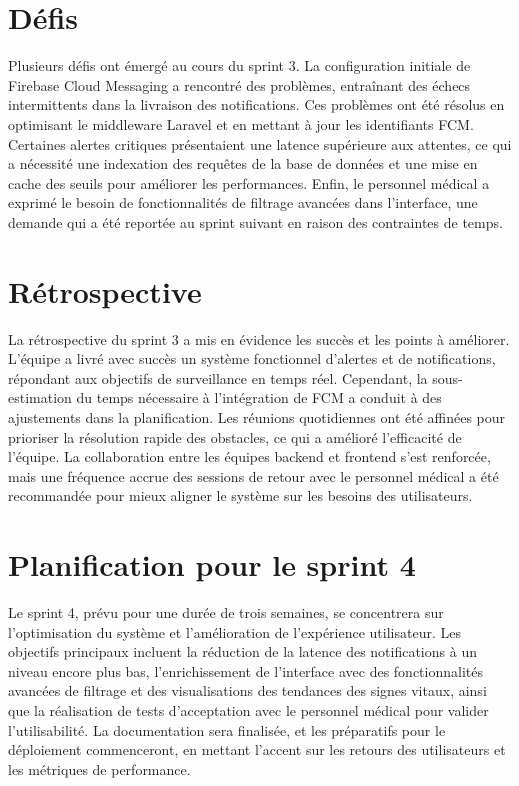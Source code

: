 \section{Défis}
Plusieurs défis ont émergé au cours du sprint 3. La configuration initiale de Firebase Cloud Messaging a rencontré des problèmes, entraînant des échecs intermittents dans la livraison des notifications. Ces problèmes ont été résolus en optimisant le middleware Laravel et en mettant à jour les identifiants FCM. Certaines alertes critiques présentaient une latence supérieure aux attentes, ce qui a nécessité une indexation des requêtes de la base de données et une mise en cache des seuils pour améliorer les performances. Enfin, le personnel médical a exprimé le besoin de fonctionnalités de filtrage avancées dans l’interface, une demande qui a été reportée au sprint suivant en raison des contraintes de temps.

\section{Rétrospective}
La rétrospective du sprint 3 a mis en évidence les succès et les points à améliorer. L’équipe a livré avec succès un système fonctionnel d’alertes et de notifications, répondant aux objectifs de surveillance en temps réel. Cependant, la sous-estimation du temps nécessaire à l’intégration de FCM a conduit à des ajustements dans la planification. Les réunions quotidiennes ont été affinées pour prioriser la résolution rapide des obstacles, ce qui a amélioré l’efficacité de l’équipe. La collaboration entre les équipes backend et frontend s’est renforcée, mais une fréquence accrue des sessions de retour avec le personnel médical a été recommandée pour mieux aligner le système sur les besoins des utilisateurs.

\section{Planification pour le sprint 4}
Le sprint 4, prévu pour une durée de trois semaines, se concentrera sur l’optimisation du système et l’amélioration de l’expérience utilisateur. Les objectifs principaux incluent la réduction de la latence des notifications à un niveau encore plus bas, l’enrichissement de l’interface avec des fonctionnalités avancées de filtrage et des visualisations des tendances des signes vitaux, ainsi que la réalisation de tests d’acceptation avec le personnel médical pour valider l’utilisabilité. La documentation sera finalisée, et les préparatifs pour le déploiement commenceront, en mettant l’accent sur les retours des utilisateurs et les métriques de performance.

